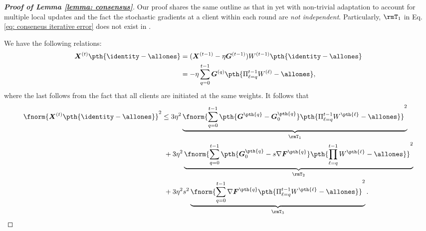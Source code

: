 \documentclass[letterpaper, 10 pt, conference]{ieeeconf}  %
\begin{document}
\begin{proof}[\bf Proof of Lemma \ref{lemma: consensus}] 
Our proof shares the same outline as that in \cite{wang2022matcha} yet with non-trivial adaptation to account for multiple local updates and the fact the stochastic gradients at a client  within each round are {\em not independent}. Particularly, $\rmT_1$ in Eq.\,\eqref{eq: conseneus iterative error} does not exist in \cite{wang2022matcha}.  

We have the following relations:
\begin{align*}
    \bm{X}^{(t)} \pth{\identity - \allones} 
    &= (\bm{X}^{(t-1)} - \eta \bm{G}^{(t-1)}) W^{(t-1)} \pth{\identity - \allones}\\
    &= - \eta \sum_{q=0}^{t-1} \bm{G}^{(q)} \pth{\Pi_{\ell=q}^{t-1} W^{(\ell)} - \allones},
\end{align*}
where the last follows from the fact that all clients are initiated at the same weights.
It follows that
\begin{align}
\label{eq: conseneus iterative error}
\nonumber
\fnorm{\bm{X}^{(t)} \pth{\identity - \allones}}^2   
& \le 3\eta^2 \underbrace{\fnorm{
    \sum_{q=0}^{t-1} 
    \pth{
    \bm{G}^{\pth{q}} - \bm{G}_0^{\pth{q}}
    }
    \pth{\Pi_{\ell=q}^{t-1} W^{\pth{\ell}} - \allones}
    }^2}_{\rmT_1}\\
    \nonumber
    &~+ 3\eta^2 \underbrace{\fnorm{\sum_{q=0}^{t-1}\pth{\bm{G}_0^{\pth{q}} - s\nabla \bm{F}^{\pth{q}}}
    \pth{\prod_{\ell=q}^{t-1} W^{\pth{\ell}} - \allones}}^2}_{\rmT_2}\\
    &~+ 3\eta^2 s^2 \underbrace{\fnorm{\sum_{q=0}^{t-1}\nabla \bm{F}^{\pth{q}}
    \pth{\Pi_{\ell=q}^{t-1} W^{\pth{\ell}} - \allones}}^2}_{\rmT_3}. 
\end{align}


\end{proof}
\end{document}
